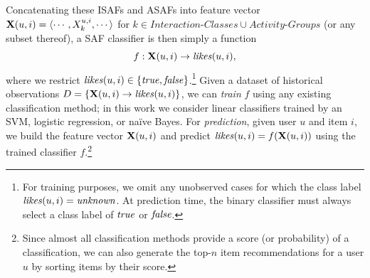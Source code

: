 

Concatenating these ISAFs and ASAFs into 
feature vector $\x(u,i) = \langle
\cdots,X^{u,i}_{k},\cdots \rangle$ for 
$k \in \textit{Interaction-Classes} \cup \textit{Activity-Groups}$
(or any subset thereof), a SAF classifier is then simply a function
\begin{equation*}
f: \x(u,i) \to \likes(u,i),
\end{equation*}
where we restrict $\likes(u,i) \in \{ \true, \false \}$.\footnote{For
  training purposes, we omit any unobserved cases for which the class
  label $\likes(u,i)=\unknown$.  At prediction time, the binary
  classifier must always select a class label of $\true$ or $\false$.}  
Given a dataset of historical
observations $D = \{ \x(u,i) \to \likes(u,i) \}$, we can \emph{train} $f$
using any existing classification method; 
in this work we consider linear classifiers
trained by an SVM, logistic regression, or na\"{i}ve
Bayes.  For \emph{prediction}, given user $u$ and
item $i$, we build the feature vector $\x(u,i)$ and 
predict $\likes(u,i) = f(\x(u,i))$ using the trained
classifier $f$.\footnote{Since almost all classification
methods provide a score (or probability) of a classification, we
can also generate the top-$n$ item recommendations for a user $u$ by
sorting items by their score.}


